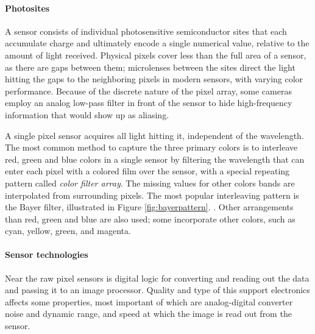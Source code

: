 \paragraph{Photosites}
A sensor consists of individual photosensitive semiconductor sites that each accumulate charge and ultimately encode a single numerical value, relative to the amount of light received.
Physical pixels cover less than the full area of a sensor, as there are gaps between them;
microlenses between the sites direct the light hitting the gaps to the neighboring pixels in modern sensors, with varying color performance. \cite{el2005cmos}
Because of the discrete nature of the pixel array, some cameras employ an analog low-pass filter in front of the sensor to hide high-frequency information that would show up as aliasing.
\cite{nakamura2005image}

A single pixel sensor acquires all light hitting it, independent of the wavelength.
The most common method to capture the three primary colors is to interleave red, green and blue colors in a single sensor by filtering the wavelength that can enter each pixel with a colored film over the sensor, with a special repeating pattern called \emph{color filter array}.
The missing values for other colors bands are interpolated from surrounding pixels.
The most popular interleaving pattern is the Bayer filter, illustrated in Figure \ref{fig:bayerpattern}.
\cite{szeliski10vision}.
Other arrangements than red, green and blue are also used; some incorporate other colors, such as cyan, yellow, green, and magenta.
\cite{park2003implementing}



\paragraph{Sensor technologies}
Near the raw pixel sensors is digital logic for converting and reading out the data and passing it to an image processor.
Quality and type of this support electronics affects some properties, most important of which are analog-digital converter noise and dynamic range, and speed at which the image is read out from the sensor.

